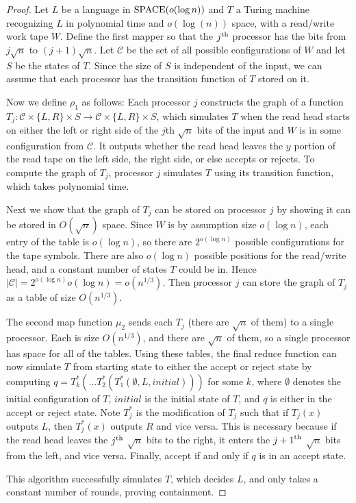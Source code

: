 \documentclass[letterpaper,USenglish]{lipics}
\theoremstyle{definition}
\theoremstyle{remark}
\begin{document}
\begin{proof}
Let $L$ be a language in $\textup{SPACE}(o(\log n))$ and $T$ a Turing machine
recognizing $L$ in polynomial time and $o(\log(n))$ space, with a read/write
work tape $W$. Define the first mapper so that the $j^\textup{th}$ processor
has the bits from $j\sqrt{n}$ to $(j+1)\sqrt{n}$. Let $\mathcal{C}$ be the set
of all possible configurations of $W$ and let $S$ be the states of $T$. Since
the size of $S$ is independent of the input, we can assume that each processor
has the transition function of $T$ stored on it.

Now we define $\rho_1$ as follows: Each processor $j$ constructs the graph of a
function $T_j:\mathcal{C} \times \{L,R\} \times S \rightarrow \mathcal{C}
\times \{L,R\} \times S$, which simulates $T$ when the read head starts on
either the left or right side of the $j$th $\sqrt{n}$ bits of the input and $W$
is in some configuration from $\mathcal{C}$. It outputs whether the read head
leaves the $y$ portion of the read tape on the left side, the right side, or
else accepts or rejects. To compute the graph of $T_j$, processor $j$
simulates $T$ using its transition function, which takes polynomial time.

Next we show that the graph of $T_j$ can be stored on processor $j$ by showing
it can be stored in $O(\sqrt{n})$ space. Since $W$ is by assumption size
$o(\log n)$, each entry of the table is $o(\log n)$, so there are $2^{o(\log
n)}$ possible configurations for the tape symbols. There are also $o(\log n)$
possible positions for the read/write head, and a constant number of states $T$
could be in. Hence $|\mathcal{C}| = 2^{o(\log n)} o(\log n) = o(n^{1/3})$.
Then processor $j$ can store the graph of $T_j$ as a table of size
$O(n^{1/3})$.

The second map function $\mu_2$ sends each $T_j$ (there are $\sqrt{n}$ of them)
to a single processor. Each is size $O(n^{1/3})$, and there are $\sqrt{n}$ of
them, so a single processor has space for all of the tables. Using these
tables, the final reduce function can now simulate $T$ from starting state to
either the accept or reject state by computing $q=T_k^*(\ldots
T_2^*(T_1^*(\emptyset,L,initial)))$ for some $k$, where $\emptyset$ denotes the
initial configuration of $T$, $initial$ is the initial state of $T$, and $q$ is
either in the accept or reject state. Note $T_j^*$ is the modification of
$T_j$ such that if $T_j(x)$ outputs $L$, then $T_j^*(x)$ outputs $R$ and vice
versa. This is necessary because if the read head leaves the $j^\textup{th}$
$\sqrt{n}$ bits to the right, it enters the ${j+1}^\textup{th}$ $\sqrt{n}$ bits
from the left, and vice versa. Finally, accept if and only if $q$ is in an
accept state.

This algorithm successfully simulates $T$, which decides $L$, and only takes a
constant number of rounds, proving containment. \end{proof}
\end{document}
